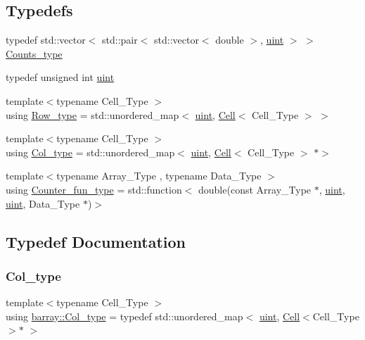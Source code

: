 \subsection*{Typedefs}
\begin{DoxyCompactItemize}
\item 
typedef std\+::vector$<$ std\+::pair$<$ std\+::vector$<$ double $>$, \hyperlink{namespacebarray_af9756a31953db233f80a9cfe1ef31c32}{uint} $>$ $>$ \hyperlink{namespacebarray_a402b1982cc07118fb03b259b3fbe6b13}{Counts\+\_\+type}
\item 
typedef unsigned int \hyperlink{namespacebarray_af9756a31953db233f80a9cfe1ef31c32}{uint}
\item 
{\footnotesize template$<$typename Cell\+\_\+\+Type $>$ }\\using \hyperlink{namespacebarray_ab4f74265365989ae59858a57ddfa92a7}{Row\+\_\+type} = std\+::unordered\+\_\+map$<$ \hyperlink{namespacebarray_af9756a31953db233f80a9cfe1ef31c32}{uint}, \hyperlink{classbarray_1_1_cell}{Cell}$<$ Cell\+\_\+\+Type $>$ $>$
\item 
{\footnotesize template$<$typename Cell\+\_\+\+Type $>$ }\\using \hyperlink{namespacebarray_a39da823e85ccd18ec69ad6d69125c8b9}{Col\+\_\+type} = std\+::unordered\+\_\+map$<$ \hyperlink{namespacebarray_af9756a31953db233f80a9cfe1ef31c32}{uint}, \hyperlink{classbarray_1_1_cell}{Cell}$<$ Cell\+\_\+\+Type $>$ $\ast$$>$
\item 
{\footnotesize template$<$typename Array\+\_\+\+Type , typename Data\+\_\+\+Type $>$ }\\using \hyperlink{namespacebarray_a94903bd0f37708633933ea88ac8e4c6a}{Counter\+\_\+fun\+\_\+type} = std\+::function$<$ double(const Array\+\_\+\+Type $\ast$, \hyperlink{namespacebarray_af9756a31953db233f80a9cfe1ef31c32}{uint}, \hyperlink{namespacebarray_af9756a31953db233f80a9cfe1ef31c32}{uint}, Data\+\_\+\+Type $\ast$)$>$
\end{DoxyCompactItemize}


\subsection{Typedef Documentation}
\mbox{\label{namespacebarray_a39da823e85ccd18ec69ad6d69125c8b9}} 
\subsubsection{\texorpdfstring{Col\+\_\+type}{Col\_type}}
{\footnotesize\ttfamily template$<$typename Cell\+\_\+\+Type $>$ \\
using \hyperlink{namespacebarray_a39da823e85ccd18ec69ad6d69125c8b9}{barray\+::\+Col\+\_\+type} = typedef std\+::unordered\+\_\+map$<$ \hyperlink{namespacebarray_af9756a31953db233f80a9cfe1ef31c32}{uint}, \hyperlink{classbarray_1_1_cell}{Cell}$<$Cell\+\_\+\+Type$>$$\ast$ $>$}




